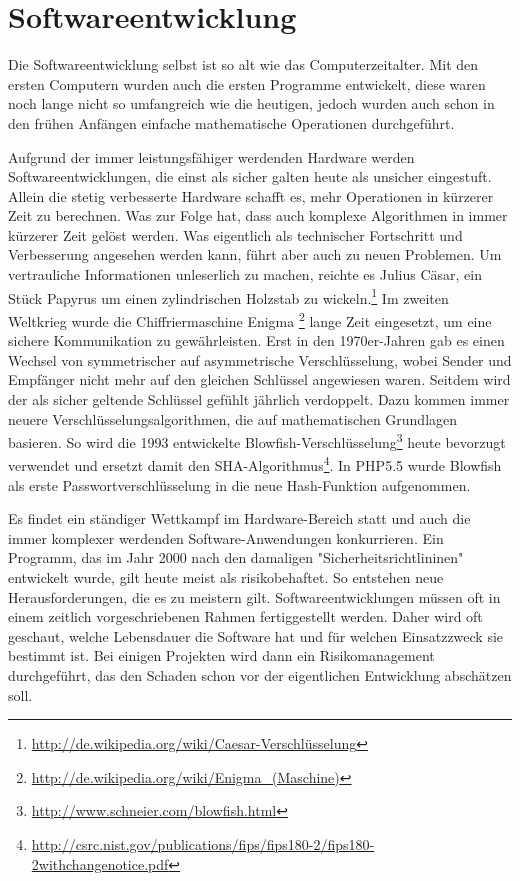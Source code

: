 \fancyhead[L]{} %
\section{Softwareentwicklung}

Die Softwareentwicklung selbst ist so alt wie das Computerzeitalter. 
Mit den ersten Computern wurden auch die ersten Programme entwickelt,
diese waren noch lange nicht so umfangreich wie die heutigen, jedoch wurden
auch schon in den frühen Anfängen einfache mathematische Operationen durchgeführt. 

Aufgrund der immer leistungsfähiger werdenden Hardware werden Softwareentwicklungen, 
die einst als sicher galten heute als unsicher eingestuft. Allein die stetig 
verbesserte Hardware schafft es, mehr Operationen in kürzerer Zeit zu berechnen.
Was zur Folge hat, dass auch komplexe Algorithmen in immer kürzerer Zeit
gelöst werden. Was eigentlich als technischer Fortschritt und Verbesserung 
angesehen werden kann, führt aber auch zu neuen Problemen.
Um vertrauliche Informationen unleserlich zu machen, reichte es Julius Cäsar, 
ein Stück Papyrus um einen zylindrischen Holzstab zu wickeln.\footnote{\url{http://de.wikipedia.org/wiki/Caesar-Verschlüsselung}} 
Im zweiten Weltkrieg wurde die Chiffriermaschine Enigma \footnote{\url{http://de.wikipedia.org/wiki/Enigma_(Maschine)}} 
lange Zeit eingesetzt, um eine sichere Kommunikation zu gewährleisten. 
Erst in den 1970er-Jahren gab es einen Wechsel von symmetrischer auf 
asymmetrische Verschlüsselung, wobei Sender und Empfänger nicht mehr auf 
den gleichen Schlüssel angewiesen waren. Seitdem wird der als sicher
geltende Schlüssel gefühlt jährlich verdoppelt. Dazu kommen immer
neuere Verschlüsselungsalgorithmen, die auf mathematischen Grundlagen basieren. 
So wird die 1993 entwickelte Blowfish-Verschlüsselung\footnote{\url{http://www.schneier.com/blowfish.html}}
heute bevorzugt verwendet und ersetzt damit den SHA-Algorithmus\footnote{\url{http://csrc.nist.gov/publications/fips/fips180-2/fips180-2withchangenotice.pdf}}. 
In PHP5.5 wurde Blowfish als erste Passwortverschlüsselung in die neue
Hash-Funktion aufgenommen.   

Es findet ein ständiger Wettkampf im Hardware-Bereich statt und auch die 
immer komplexer werdenden Software-Anwendungen konkurrieren. Ein Programm, 
das im Jahr 2000 nach den damaligen "Sicherheitsrichtlininen" 
entwickelt wurde, gilt heute meist als risikobehaftet. So entstehen 
neue Herausforderungen, die es zu meistern gilt. 
Softwareentwicklungen müssen oft in einem zeitlich vorgeschriebenen 
Rahmen fertiggestellt werden. Daher wird oft geschaut, welche Lebensdauer 
die Software hat und für welchen Einsatzzweck sie bestimmt ist. Bei einigen
Projekten wird dann ein Risikomanagement durchgeführt, das den 
Schaden schon vor der eigentlichen Entwicklung abschätzen soll.

